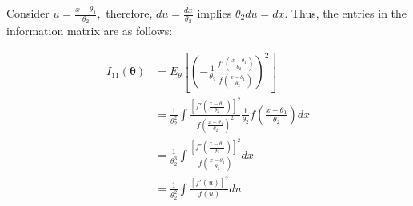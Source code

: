 \documentclass[12pt,]{article}
\begin{document}
Consider \(u=\frac{x-\theta_1}{\theta_2},\) therefore,
\(du = \frac{dx}{\theta_2}\) implies \(\theta_2 du = dx\). Thus, the
entries in the information matrix are as follows:

\begin{align*}
I_{11}(\boldsymbol\theta) & =E_\theta\left[\left(-\frac{1}{\theta_2}\frac{f'\left(\frac{x-\theta_1}{\theta_2}\right)}{f\left(\frac{x-\theta_1}{\theta_2}\right)}\right)^2\right]\\
& =\frac{1}{\theta_2^2}\int\frac{\left[f'\left(\frac{x-\theta_1}{\theta_2}\right)\right]^2}{f\left(\frac{x-\theta_1}{\theta_2}\right)^2}\frac{1}{\theta_2}f\left(\frac{x-\theta_1}{\theta_2}\right)dx\\
& =\frac{1}{\theta_2^3}\int\frac{\left[f'\left(\frac{x-\theta_1}{\theta_2}\right)\right]^2}{f\left(\frac{x-\theta_1}{\theta_2}\right)}dx\\
& =\frac{1}{\theta_2^2}\int\frac{[f'(u)]^2}{f(u)}du
\end{align*}
\end{document}
